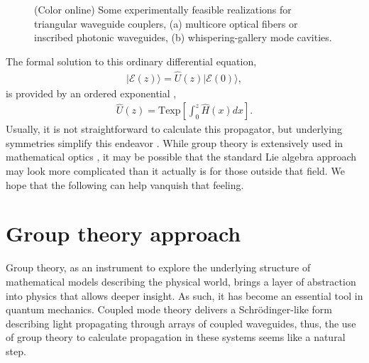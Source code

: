 \documentclass[9pt,twocolumn,twoside]{osajnl}
\begin{document}
\begin{figure}[htbp]
\centering
{}
\caption{(Color online) Some experimentally feasible realizations for triangular waveguide couplers, (a)  multicore optical fibers or inscribed photonic waveguides, (b) whispering-gallery mode cavities.}
\label{fig:Fig1}
\end{figure}


The formal solution to this ordinary differential equation,
\begin{eqnarray}
\vert \mathcal{E}(z) \rangle = \hat{U}(z) \vert \mathcal{E}(0) \rangle,
\end{eqnarray}
is provided by an ordered exponential \cite{Magnus1954p649,Blanes2009p151}, 
\begin{eqnarray} 
\hat{U}(z) = \mathrm{Texp} \left[ \int_{0}^{z} \hat{H}(x) dx \right].
\end{eqnarray}
Usually, it is not straightforward to calculate this propagator,
but underlying symmetries simplify this endeavor \cite{Lie1880p441,Wei1963p575,Neumaier2008}.
While group theory is extensively used in mathematical optics \cite{Wolf2004,Lakshminarayanan2012}, it may be possible that the standard Lie algebra approach may look more complicated than it actually is for those outside that field. 
We hope that the following can help vanquish that feeling.


\section{Group theory approach}

Group theory, as an instrument to explore the underlying structure of mathematical models describing the physical world, brings a layer of abstraction into physics that allows deeper insight.
As such, it has become an essential tool in quantum mechanics.
Coupled mode theory delivers a Schr\"odinger-like form describing light propagating through arrays of coupled waveguides, thus, the use of group theory to calculate propagation in these systems seems like a natural step.
\end{document}
